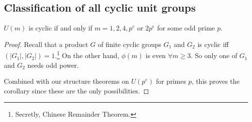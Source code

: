 \subsection{Classification of all cyclic unit groups}
\begin{corollary}
    $U(m)$ is cyclic if and only if $m = 1, 2, 4, p^e$ or $2p^e$ for some odd prime $p$.
\end{corollary}
\begin{proof}
    Recall that a product $G$ of finite cyclic groups $G_1$ and $G_2$ is cyclic iff $(|G_1|, |G_2|) = 1$.\footnote{Secretly, Chinese Remainder Theorem.} On the other hand, $\phi(m)$ is even $\forall m\geq 3$. So only one of $G_1$ and $G_2$ needs odd power.

    Combined with our structure theorems on $U(p^e)$ for primes $p$, this proves the corollary since these are the only possibilities.
\end{proof}